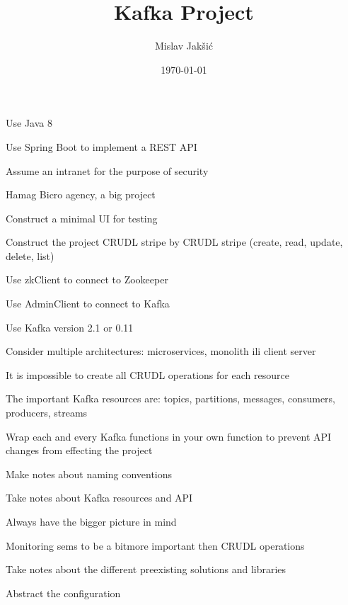 \documentclass{article}
\title{Kafka Project}
\author{Mislav Jakšić}
\date{\today{}}
\begin{document}
\maketitle

Use Java 8

Use Spring Boot to implement a REST API

Assume an intranet for the purpose of security

Hamag Bicro agency, a big project

Construct a minimal UI for testing

Construct the project CRUDL stripe by CRUDL stripe (create, read, update, delete, list)

Use zkClient to connect to Zookeeper

Use AdminClient to connect to Kafka

Use Kafka version 2.1 or 0.11

Consider multiple architectures: microservices, monolith ili client server

It is impossible to create all CRUDL operations for each resource

The important Kafka resources are: topics, partitions, messages, consumers, producers, streams

Wrap each and every Kafka functions in your own function to prevent API changes from effecting the project

Make notes about naming conventions

Take notes about Kafka resources and API

Always have the bigger picture in mind

Monitoring sems to be a bitmore important then CRUDL operations

Take notes about the different preexisting solutions and libraries

Abstract the configuration
\end{document}
